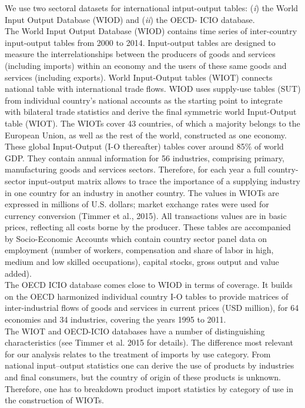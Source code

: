 \documentclass[11pt,a4paper]{article}
\begin{document}
We use two sectoral datasets for international intput-output tables: (\textit{i}) the World Input Output Database (WIOD) and (\textit{ii}) the OECD- ICIO database.\\
The World Input Output Database (WIOD) contains time series of inter-country input-output tables from 2000 to 2014. Input-output tables are designed to measure the interrelationships between the producers of goods and services (including imports) within an economy and the users of these same goods and services (including exports). World Input-Output tables (WIOT) connects national table with international trade flows. WIOD uses supply-use tables (SUT) from individual country’s national accounts as the starting point to integrate with bilateral trade statistics and derive the final symmetric world Input-Output table (WIOT). The WIOTs cover 43 countries, of which a majority belongs to the European Union, as well as the rest of the world, constructed as one economy. 
These global Input-Output (I-O thereafter) tables cover around 85$\%$ of world GDP. They contain annual information for 56 industries, comprising primary, manufacturing goods and services sectors. Therefore, for each year a full country-sector input-output matrix allows to trace the importance of a supplying industry in one country for an industry in another country. The values in WIOTs are expressed in millions of U.S. dollars; market exchange rates were used for currency conversion (Timmer et al., 2015). All transactions values are in basic prices, reflecting all costs borne by the producer. These tables are accompanied by Socio-Economic Accounts which contain country sector panel data on employment (number of workers, compensation and share of labor in high, medium and low skilled occupations), capital stocks, gross output and value added).\\
The OECD ICIO database comes close to WIOD in terms of coverage. It builds on the OECD harmonized individual country I-O tables to provide matrices of inter-industrial flows of goods and services in current prices (USD million), for 64 economies and 34 industries, covering the years 1995 to 2011. \\
The WIOT and OECD-ICIO databases have a number of distinguishing characteristics (see Timmer et al. 2015 for details). The difference most relevant for our analysis relates to the treatment of imports by use category. From national input–output statistics one can derive the use of products by industries and final consumers, but the country of origin of these products is unknown. Therefore, one has to breakdown product import statistics by category of use in the construction of WIOTs.\\
\end{document}
